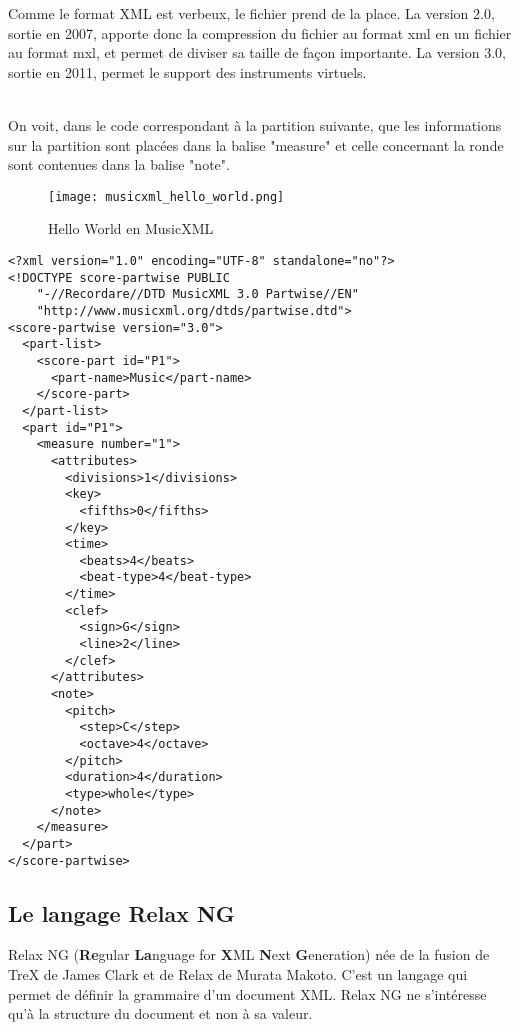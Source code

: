 \par
Comme le format XML est verbeux, le fichier prend de la place. La version 2.0, sortie en 2007, apporte donc la compression du fichier au format xml en un fichier au format mxl, et permet de diviser sa taille de façon importante. La version 3.0, sortie en 2011, permet le support des instruments virtuels.\\~\\

\par
On voit, dans le code correspondant à la partition suivante, que les informations sur la partition sont placées dans la balise "measure" et celle concernant la ronde sont contenues dans la balise "note".

\begin{figure}[!h] %
\centering
\texttt{[image: musicxml\_hello\_world.png]}\\[1cm]
\caption{Hello World en MusicXML}
\label{Hello World en MusicXML}
\end{figure}


\begin{lstlisting}[caption=Document XML d'un Hello World en MusicXML, label=ruleml]
<?xml version="1.0" encoding="UTF-8" standalone="no"?>
<!DOCTYPE score-partwise PUBLIC
    "-//Recordare//DTD MusicXML 3.0 Partwise//EN"
    "http://www.musicxml.org/dtds/partwise.dtd">
<score-partwise version="3.0">
  <part-list>
    <score-part id="P1">
      <part-name>Music</part-name>
    </score-part>
  </part-list>
  <part id="P1">
    <measure number="1">
      <attributes>
        <divisions>1</divisions>
        <key>
          <fifths>0</fifths>
        </key>
        <time>
          <beats>4</beats>
          <beat-type>4</beat-type>
        </time>
        <clef>
          <sign>G</sign>
          <line>2</line>
        </clef>
      </attributes>
      <note>
        <pitch>
          <step>C</step>
          <octave>4</octave>
        </pitch>
        <duration>4</duration>
        <type>whole</type>
      </note>
    </measure>
  </part>
</score-partwise>
\end{lstlisting}


\subsection{Le langage Relax NG}

Relax NG (\textbf{Re}gular \textbf{La}nguage for \textbf{X}ML \textbf{N}ext \textbf{G}eneration) \cite{relaxng} née de la fusion de TreX de James Clark et de Relax de Murata Makoto. C'est un langage qui permet de définir la grammaire d'un document XML. Relax NG ne s'intéresse qu'à la structure du document et non à sa valeur.

